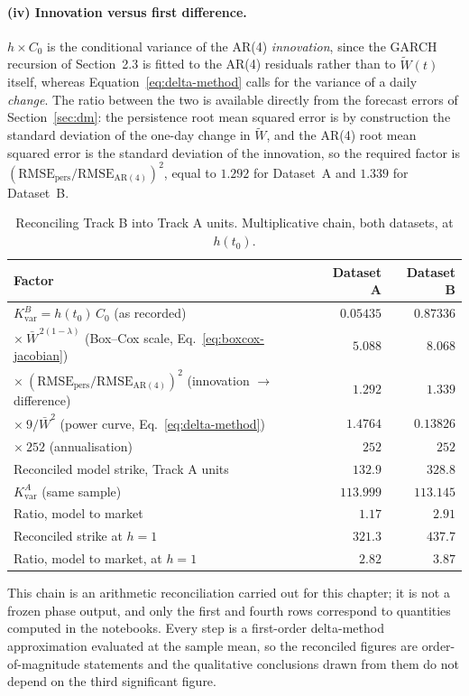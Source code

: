 \documentclass[11pt, a4paper, twoside]{article}
\begin{document}
\paragraph{(iv) Innovation versus first difference.} $h \times C_0$ is the conditional variance of the AR(4) \emph{innovation}, since the GARCH recursion of Section~2.3 is fitted to the AR(4) residuals rather than to $\widetilde W(t)$ itself, whereas Equation~\eqref{eq:delta-method} calls for the variance of a daily \emph{change}. The ratio between the two is available directly from the forecast errors of Section~\ref{sec:dm}: the persistence root mean squared error is by construction the standard deviation of the one-day change in $\widetilde W$, and the AR(4) root mean squared error is the standard deviation of the innovation, so the required factor is $(\mathrm{RMSE}_{\text{pers}}/\mathrm{RMSE}_{\mathrm{AR}(4)})^2$, equal to $1.292$ for Dataset~A and $1.339$ for Dataset~B.

\begin{table}[htbp]
\centering
\small
\caption{Reconciling Track B into Track A units. Multiplicative chain, both datasets, at $h(t_0)$.}
\label{tab:reconciliation}
\begin{tabular}{l r r}
\toprule
\textbf{Factor} & \textbf{Dataset A} & \textbf{Dataset B} \\
\midrule
$K_{\text{var}}^B = h(t_0)\,C_0$ (as recorded) & $0.05435$ & $0.87336$ \\
$\times\ \bar W^{\,2(1-\lambda)}$ \quad (Box--Cox scale, Eq.~\ref{eq:boxcox-jacobian}) & $5.088$ & $8.068$ \\
$\times\ (\mathrm{RMSE}_{\text{pers}}/\mathrm{RMSE}_{\mathrm{AR}(4)})^2$ \quad (innovation $\to$ difference) & $1.292$ & $1.339$ \\
$\times\ 9/\bar W^2$ \quad (power curve, Eq.~\ref{eq:delta-method}) & $1.4764$ & $0.13826$ \\
$\times\ 252$ \quad (annualisation) & $252$ & $252$ \\
\midrule
Reconciled model strike, Track A units & $132.9$ & $328.8$ \\
$K_{\text{var}}^A$ (same sample) & $113.999$ & $113.145$ \\
Ratio, model to market & $1.17$ & $2.91$ \\
\midrule
Reconciled strike at $h = 1$ & $321.3$ & $437.7$ \\
Ratio, model to market, at $h = 1$ & $2.82$ & $3.87$ \\
\bottomrule
\end{tabular}
\par\vspace{4pt}
\begin{minipage}{0.92\textwidth}
\footnotesize This chain is an arithmetic reconciliation carried out for this chapter; it is not a frozen phase output, and only the first and fourth rows correspond to quantities computed in the notebooks. Every step is a first-order delta-method approximation evaluated at the sample mean, so the reconciled figures are order-of-magnitude statements and the qualitative conclusions drawn from them do not depend on the third significant figure.
\end{minipage}
\end{table}
\end{document}
